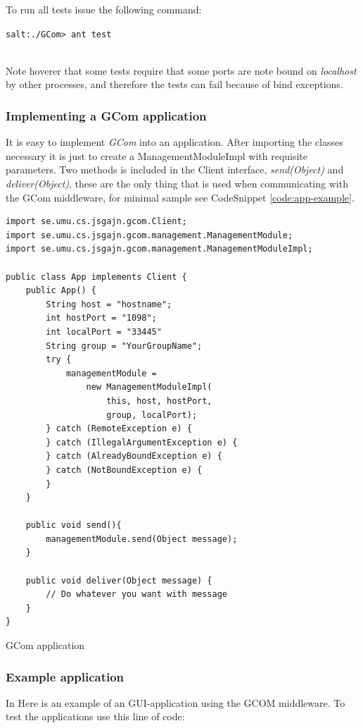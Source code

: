 \documentclass[titlepage, twocolumn, a4paper, 10pt]{article}
\begin{document}
To run all tests issue the following command:\\
\begin{footnotesize}
  \verb!salt:./GCom> ant test!
\end{footnotesize}\\
Note hoverer that some tests require that some ports are note bound on
\textit{localhost} by other processes, and therefore the tests can
fail because of bind exceptions.

\subsubsection{Implementing a GCom application}\label{sec:implgcom}
It is easy to implement \textit{GCom} into an application. After
importing the classes necessary it is just to create a
ManagementModuleImpl with requisite parameters. Two methods is
included in the Client interface, \textit{send(Object)} and
\textit{deliver(Object)}, these are the only thing that is used when
communicating with the GCom middleware, for minimal sample see
CodeSnippet \ref{code:app-example}.
\begin{code}
  \begin{footnotesize}
\begin{verbatim}
import se.umu.cs.jsgajn.gcom.Client;
import se.umu.cs.jsgajn.gcom.management.ManagementModule;
import se.umu.cs.jsgajn.gcom.management.ManagementModuleImpl;

public class App implements Client {
    public App() {
        String host = "hostname";
        int hostPort = "1098";
        int localPort = "33445"
        String group = "YourGroupName";
        try {
            managementModule =
                new ManagementModuleImpl(
                    this, host, hostPort,
                    group, localPort);
        } catch (RemoteException e) {
        } catch (IllegalArgumentException e) {
        } catch (AlreadyBoundException e) {
        } catch (NotBoundException e) {
        }
    }

    public void send(){
        managementModule.send(Object message);
    }

    public void deliver(Object message) {
        // Do whatever you want with message
    }
}
\end{verbatim}
  \end{footnotesize}
  \caption{GCom application}
  \label{code:app-example}
\end{code}


\subsubsection{Example application}\label{sec:exapp}
In Here is an example of an GUI-application using the GCOM 
middleware. To test the applications use this line of code:
\\
\\
\end{document}
